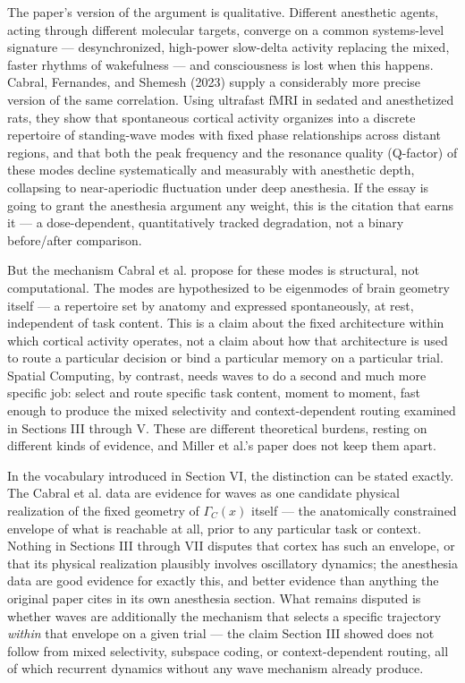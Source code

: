 \documentclass[11pt]{article}
\begin{document}
The paper's version of the argument is qualitative. Different anesthetic agents, acting through different molecular targets, converge on a common systems-level signature — desynchronized, high-power slow-delta activity replacing the mixed, faster rhythms of wakefulness — and consciousness is lost when this happens. Cabral, Fernandes, and Shemesh (2023) supply a considerably more precise version of the same correlation. Using ultrafast fMRI in sedated and anesthetized rats, they show that spontaneous cortical activity organizes into a discrete repertoire of standing-wave modes with fixed phase relationships across distant regions, and that both the peak frequency and the resonance quality (Q-factor) of these modes decline systematically and measurably with anesthetic depth, collapsing to near-aperiodic fluctuation under deep anesthesia. If the essay is going to grant the anesthesia argument any weight, this is the citation that earns it — a dose-dependent, quantitatively tracked degradation, not a binary before/after comparison.

But the mechanism Cabral et al. propose for these modes is structural, not computational. The modes are hypothesized to be eigenmodes of brain geometry itself — a repertoire set by anatomy and expressed spontaneously, at rest, independent of task content. This is a claim about the fixed architecture within which cortical activity operates, not a claim about how that architecture is used to route a particular decision or bind a particular memory on a particular trial. Spatial Computing, by contrast, needs waves to do a second and much more specific job: select and route specific task content, moment to moment, fast enough to produce the mixed selectivity and context-dependent routing examined in Sections III through V. These are different theoretical burdens, resting on different kinds of evidence, and Miller et al.'s paper does not keep them apart.

In the vocabulary introduced in Section VI, the distinction can be stated exactly. The Cabral et al. data are evidence for waves as one candidate physical realization of the fixed geometry of $\Gamma_C(x)$ itself — the anatomically constrained envelope of what is reachable at all, prior to any particular task or context. Nothing in Sections III through VII disputes that cortex has such an envelope, or that its physical realization plausibly involves oscillatory dynamics; the anesthesia data are good evidence for exactly this, and better evidence than anything the original paper cites in its own anesthesia section. What remains disputed is whether waves are additionally the mechanism that selects a specific trajectory \textit{within} that envelope on a given trial — the claim Section III showed does not follow from mixed selectivity, subspace coding, or context-dependent routing, all of which recurrent dynamics without any wave mechanism already produce.
\end{document}
